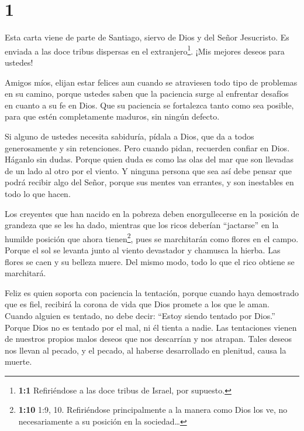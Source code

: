 \hypertarget{section}{%
\section{1}\label{section}}

 Esta carta viene de parte de Santiago, siervo de Dios y del
Señor Jesucristo. Es enviada a las doce tribus dispersas en el
extranjero\footnote{\textbf{1:1} Refiriéndose a las doce tribus de
  Israel, por supuesto.}. ¡Mis mejores deseos para ustedes!

 Amigos míos, elijan estar felices aun cuando se atraviesen
todo tipo de problemas en su camino,  porque ustedes saben
que la paciencia surge al enfrentar desafíos en cuanto a su fe en Dios.
 Que su paciencia se fortalezca tanto como sea posible, para
que estén completamente maduros, sin ningún defecto.

 Si alguno de ustedes necesita sabiduría, pídala a Dios, que
da a todos generosamente y sin retenciones.  Pero cuando
pidan, recuerden confiar en Dios. Háganlo sin dudas. Porque quien duda
es como las olas del mar que son llevadas de un lado al otro por el
viento.  Y ninguna persona que sea así debe pensar que podrá
recibir algo del Señor,  porque sus mentes van errantes, y
son inestables en todo lo que hacen.

 Los creyentes que han nacido en la pobreza deben
enorgullecerse en la posición de grandeza que se les ha dado,
 mientras que los ricos deberían ``jactarse'' en la humilde
posición que ahora tienen\footnote{\textbf{1:10} 1:9, 10. Refiriéndose
  principalmente a la manera como Dios los ve, no necesariamente a su
  posición en la sociedad\ldots{}}, pues se marchitarán como flores en
el campo.  Porque el sol se levanta junto al viento
devastador y chamusca la hierba. Las flores se caen y su belleza muere.
Del mismo modo, todo lo que el rico obtiene se marchitará.

 Feliz es quien soporta con paciencia la tentación, porque
cuando haya demostrado que es fiel, recibirá la corona de vida que Dios
promete a los que le aman.  Cuando alguien es tentado, no
debe decir: ``Estoy siendo tentado por Dios.'' Porque Dios no es tentado
por el mal, ni él tienta a nadie.  Las tentaciones vienen
de nuestros propios malos deseos que nos descarrían y nos atrapan.
 Tales deseos nos llevan al pecado, y el pecado, al haberse
desarrollado en plenitud, causa la muerte.

